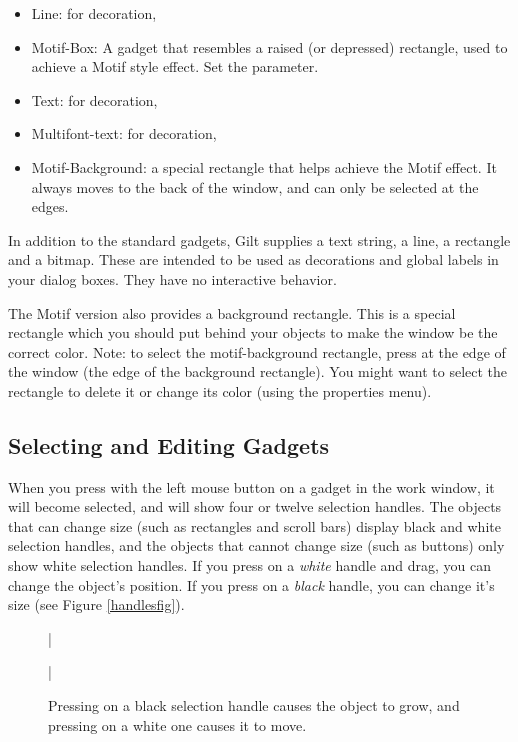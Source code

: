 \begin{itemize}
\item Line: for decoration,

\item Motif-Box: A gadget that resembles a raised (or depressed) rectangle, used to
achieve a Motif style effect.  Set the  parameter.

\item Text: for decoration,

\item Multifont-text: for decoration,

\item Motif-Background: a special rectangle that helps achieve the Motif effect.
It always moves to the back of the window, and can only be selected at the
edges.
\end{itemize}

In addition to the standard gadgets, Gilt supplies a text string, a
line, a rectangle and a bitmap.  These are intended to be used as
decorations and
global labels in your dialog boxes.  They have no interactive behavior.

The Motif version also provides a background rectangle.   This is a
special rectangle which you should put behind your objects to make the
window be the correct color.  Note: to select the motif-background
rectangle, press at the edge of the window (the edge of the background
rectangle).  You might want to select the rectangle to delete it or
change its color (using the properties menu).


\subsection{Selecting and Editing Gadgets}

When you press with the left mouse button on a gadget in the work window,
it will become selected, and will show four or twelve selection handles.
The objects
that can change size (such as rectangles and scroll bars) display
black and white selection handles, and the objects that cannot change
size (such as buttons) only show white selection handles.
If you press on a
{\it white} handle and drag, you can change the object's position.  If you
press on a {\it black} handle, you can change it's size (see Figure
\ref{handlesfig}).

\begin{figure}
\bar{}
\begin{center}
\end{center}
\caption{Pressing on a black selection handle causes the object to
grow, and pressing on a white one causes it to move.}
\bar{}
\end{figure}


